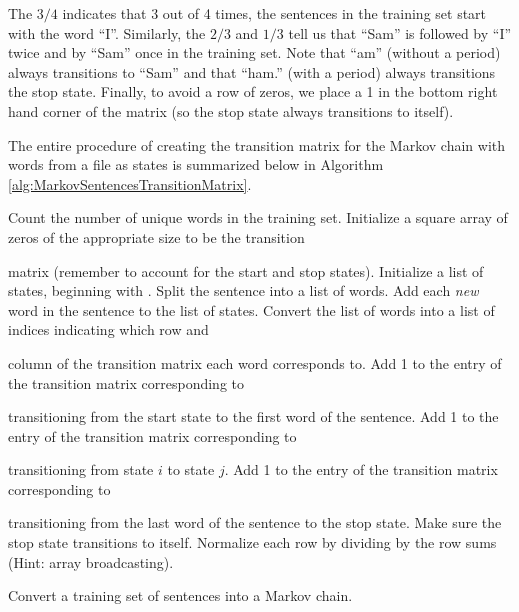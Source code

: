 The $3/4$ indicates that 3 out of 4 times, the sentences in the training set start with the word ``I''.
Similarly, the $2/3$ and $1/3$ tell us that ``Sam'' is followed by ``I'' twice and by ``Sam'' once in the training set.
Note that ``am'' (without a period) always transitions to ``Sam'' and that ``ham.'' (with a period) always transitions the stop state.
Finally, to avoid a row of zeros, we place a 1 in the bottom right hand corner of the matrix (so the stop state always transitions to itself).

The entire procedure of creating the transition matrix for the Markov chain with words from a file as states is summarized below in Algorithm \ref{alg:MarkovSentencesTransitionMatrix}.

\begin{algorithm} %
\begin{algorithmic}[1]
\State Count the number of unique words in the training set.
\State Initialize a square array of zeros of the appropriate size to be the transition \par\quad matrix (remember to account for the start and stop states).
\State Initialize a list of states, beginning with .
    \State Split the sentence into a list of words.
    \State Add each \emph{new} word in the sentence to the list of states.
    \State Convert the list of words into a list of indices indicating which row and \par\qquad\enspace column of the transition matrix each word corresponds to.
    \State Add 1 to the entry of the transition matrix corresponding to
    \par\qquad\enspace transitioning from the start state to the first word of the sentence.
        \State Add 1 to the entry of the transition matrix corresponding to \par\qquad\qquad transitioning from state $i$ to state $j$.
    \EndFor
    \State Add 1 to the entry of the transition matrix corresponding to
    \par\qquad\enspace transitioning from the last word of the sentence to the stop state.
\EndFor
\State Make sure the stop state transitions to itself.
\State Normalize each row by dividing by the row sums (Hint: array broadcasting).
\EndProcedure
\end{algorithmic}
\caption{Convert a training set of sentences into a Markov chain.}
\label{alg:MarkovSentencesTransitionMatrix}
\end{algorithm}

